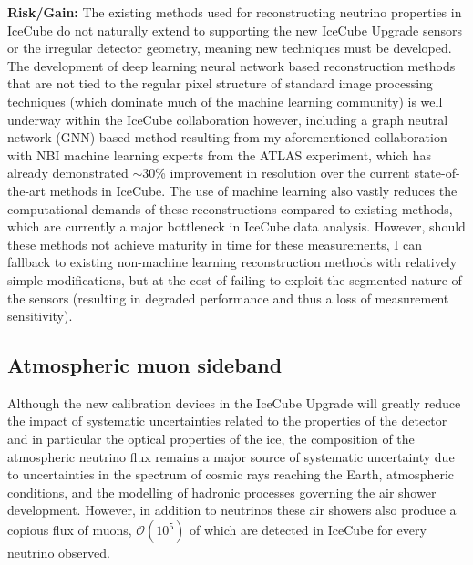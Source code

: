 \documentclass[a4paper,11pt]{article}
\begin{document}
\textbf{Risk/Gain:} The existing methods used for reconstructing neutrino properties in IceCube do not naturally extend to supporting the new IceCube Upgrade sensors or the irregular detector geometry, meaning new techniques must be developed. The development of deep learning neural network based reconstruction methods that are not tied to the regular pixel structure of standard image processing techniques (which dominate much of the machine learning community) is well underway within the IceCube collaboration however, including a graph neutral network (GNN) based method resulting from my aforementioned collaboration with NBI machine learning experts from the ATLAS experiment, which has already demonstrated $\sim$30\% improvement in resolution over the current state-of-the-art methods in IceCube. The use of machine learning also vastly reduces the computational demands of these reconstructions compared to existing methods, which are currently a major bottleneck in IceCube data analysis. However, should these methods not achieve maturity in time for these measurements, I can fallback to existing non-machine learning reconstruction methods with relatively simple modifications, but at the cost of failing to exploit the segmented nature of the sensors (resulting in degraded performance and thus a loss of measurement sensitivity). \\




\subsection{Atmospheric muon sideband}

Although the new calibration devices in the IceCube Upgrade will greatly reduce the impact of systematic uncertainties related to the properties of the detector and in particular the optical properties of the ice, the composition of the atmospheric neutrino flux remains a major source of systematic uncertainty due to uncertainties in the spectrum of cosmic rays reaching the Earth, atmospheric conditions, and the modelling of hadronic processes governing the air shower development. However, in addition to neutrinos these air showers also produce a copious flux of muons, $\mathcal{O}(10^5)$ of which are detected in IceCube for every neutrino observed. 
\end{document}
